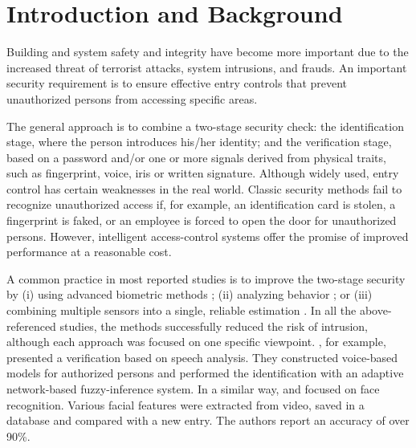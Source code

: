 \section{Introduction and Background}

Building and system safety and integrity have become more important due to the increased threat of terrorist attacks, system intrusions, and frauds. An important security requirement is to ensure effective entry controls that prevent unauthorized persons from accessing specific areas. 

The general approach is to combine a two-stage security check: the identification stage, where the person introduces his/her identity; and the verification stage, based on a password and/or one or more signals derived from physical traits, such as fingerprint, voice, iris or written signature. Although widely used, entry control has certain weaknesses in the real world. Classic security methods fail to recognize unauthorized access if, for example, an identification card is stolen, a fingerprint is faked, or an employee is forced to open the door for unauthorized persons. 
However, intelligent access-control systems offer the promise of improved performance at a reasonable cost.

A common practice in most reported studies is to improve the two-stage security by (i) using advanced biometric methods \citep{Wahyudi2007, Wong2009, Sun2008}; (ii) analyzing behavior \citep{Zhang2007, Lin2008, Quah2008, Alexandre1997, wilson2006, Stephen2005, Depren2005}; or (iii) combining multiple sensors into a single, reliable estimation \citep{lamborn2006, Bontempi2005, Fierrez-Aguilar2005}. In all the above-referenced studies, the methods successfully reduced the risk of intrusion, although each approach was focused on one specific viewpoint. \citet{Wahyudi2007}, for example, presented a verification based on speech analysis. They constructed voice-based models for authorized persons and performed the identification with an adaptive network-based fuzzy-inference system. In a similar way, \citet{Wong2009} and \citet{Sun2008} focused on face recognition. Various facial features were extracted from video, saved in a database and compared with a new entry. The authors report an accuracy of over 90\%.

